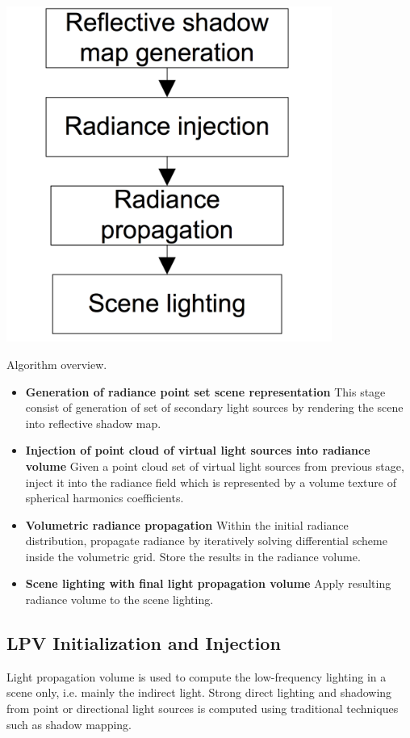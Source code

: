 \begin{marginfigure}
\begin{center}
	\includegraphics[width=0.8\textwidth]{graphics/lpv/lpv-1}
\end{center}
	\caption{Algorithm overview.}
	\label{f:lpv-process}
\end{marginfigure}

\begin{itemize}
	\item \textbf{Generation of radiance point set scene representation} This stage consist of generation of set of secondary light sources by rendering the scene into reflective shadow map.
	\item \textbf{Injection of point cloud of virtual light sources into radiance volume} Given a point cloud set of virtual light sources from previous stage, inject it into the radiance field which is represented by a volume texture of spherical harmonics coefficients.
	\item \textbf{Volumetric radiance propagation} Within the initial radiance distribution, propagate radiance by iteratively solving differential scheme inside the volumetric grid. Store the results in the radiance volume.
	\item \textbf{Scene lighting with final light propagation volume} Apply resulting radiance volume to the scene lighting. 
\end{itemize}




\subsection{LPV Initialization and Injection}
Light propagation volume is used to compute the low-frequency lighting in a scene only, i.e. mainly the indirect light. Strong direct lighting and shadowing from point or directional light sources is computed using traditional techniques such as shadow mapping.

